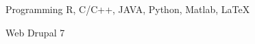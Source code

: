 

\begin{cvskills}

  \cvskill
    {Programming} %
    {R, C/C++, JAVA, Python, Matlab, LaTeX} %

  \cvskill
    {Web} %
    {Drupal 7} %

\end{cvskills}
